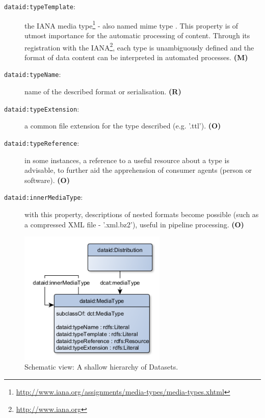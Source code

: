 \documentclass[a4paper,english,twoside,BCOR1.5cm,headsepline,DIV12,appendixprefix,final,12pt]{scrbook}
\newcommand{\prop}[1]{{{\texttt{#1}}}}
\newcommand\footnoteurl[1]{\footnote{\scriptsize\url{#1}}}
\begin{document}
\begin{description}
\item[\prop{dataid:typeTemplate}:] the IANA media type\footnoteurl{http://www.iana.org/assignments/media-types/media-types.xhtml} - also named mime type \cite{freed1996rfc2046}. This property is of utmost importance for the automatic processing of content. Through its registration with the IANA\footnoteurl{http://www.iana.org}, each type is unambiguously defined and the format of data content can be interpreted in automated processes. \textbf{(M)}
\item[\prop{dataid:typeName}:] name of the described format or serialisation. \textbf{(R)}
\item[\prop{dataid:typeExtension}:] a common file extension for the type described (e.g. '.ttl'). \textbf{(O)}
\item[\prop{dataid:typeReference}:] in some instances, a reference to a useful resource about a type is advisable, to further aid the apprehension of consumer agents (person or software). \textbf{(O)}
\item[\prop{dataid:innerMediaType}:] with this property, descriptions of nested formats become possible (such as a compressed XML file - '.xml.bz2'), useful in pipeline processing. \textbf{(O)}
\end{description}

\begin{figure}[!htbp]
\centering
  \includegraphics[width=7cm]{images/ClassMediaType.png}
  \caption{Schematic view: A shallow hierarchy of Datasets.}
  \label{fig:example}
\end{figure}
\end{document}
